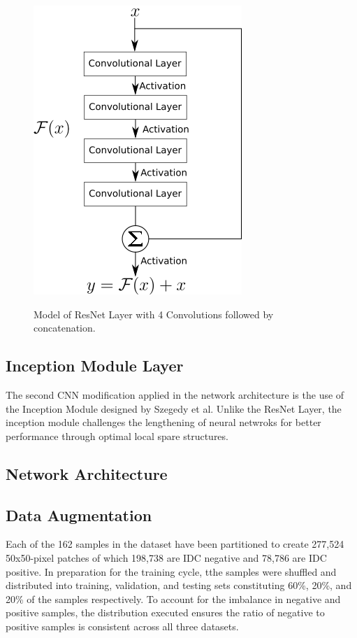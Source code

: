 \documentclass[conference]{IEEEtran}
\begin{document}
\begin{figure}
\centering
\includegraphics[scale=0.65]{figures/ResNet_Model.png}
\label{ResNet Layer Model}
\caption{Model of ResNet Layer with 4 Convolutions followed by concatenation.}
\end{figure}

\subsection{Inception Module Layer}
The second CNN modification applied in the network architecture is the use of the Inception Module \cite{Szegedy2014} designed by Szegedy et al. Unlike the ResNet Layer, the inception module challenges the lengthening of neural netwroks for better performance through optimal local spare structures.

\subsection{Network Architecture}
\subsection{Data Augmentation}
Each of the 162 samples in the dataset have been partitioned to create 277,524 50x50-pixel patches of which 198,738 are IDC negative and 78,786 are IDC positive. In preparation for the training cycle, tthe samples were shuffled and distributed into training, validation, and testing sets constituting 60\%, 20\%, and 20\% of the samples respectively. To account for the imbalance in negative and positive samples, the distribution executed ensures the ratio of negative to positive samples is consistent across all three datasets.
\end{document}
